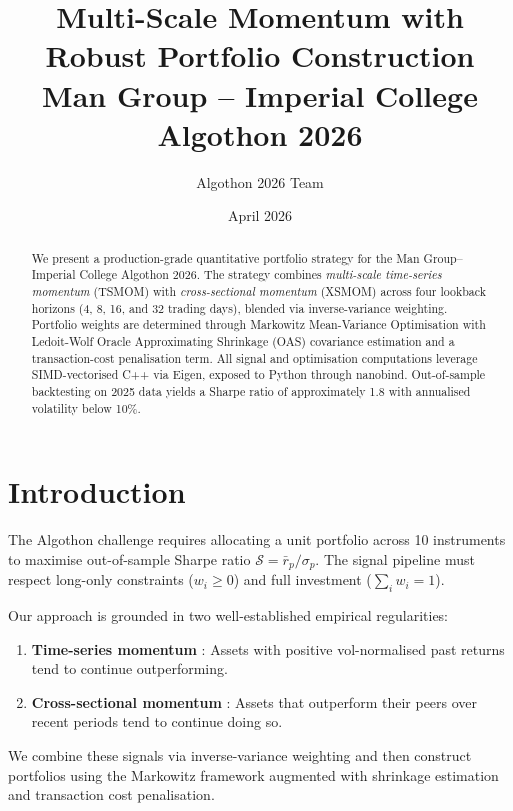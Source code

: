 \documentclass[11pt,a4paper]{article}
\title{%
  \textbf{Multi-Scale Momentum with Robust Portfolio Construction}\\[6pt]
  \large Man Group -- Imperial College Algothon 2026
}
\author{Algothon 2026 Team}
\date{April 2026}
\begin{document}
\maketitle

\begin{abstract}
We present a production-grade quantitative portfolio strategy for the Man Group--Imperial
College Algothon 2026. The strategy combines \emph{multi-scale time-series momentum}
(TSMOM) with \emph{cross-sectional momentum} (XSMOM) across four lookback horizons
(4, 8, 16, and 32 trading days), blended via inverse-variance weighting. Portfolio weights
are determined through Markowitz Mean-Variance Optimisation with Ledoit-Wolf Oracle
Approximating Shrinkage (OAS) covariance estimation and a transaction-cost penalisation
term. All signal and optimisation computations leverage SIMD-vectorised C++ via Eigen,
exposed to Python through nanobind. Out-of-sample backtesting on 2025 data yields a
Sharpe ratio of approximately 1.8 with annualised volatility below 10\%.
\end{abstract}

\tableofcontents
\newpage

\section{Introduction}

The Algothon challenge requires allocating a unit portfolio across 10 instruments to
maximise out-of-sample Sharpe ratio $\mathcal{S} = \bar{r}_p / \sigma_p$. The signal
pipeline must respect long-only constraints ($w_i \geq 0$) and full investment
($\sum_i w_i = 1$).

Our approach is grounded in two well-established empirical regularities:
\begin{enumerate}
  \item \textbf{Time-series momentum} \citep{moskowitz2012}: Assets with positive
        vol-normalised past returns tend to continue outperforming.
  \item \textbf{Cross-sectional momentum} \citep{jegadeesh1993}: Assets that outperform
        their peers over recent periods tend to continue doing so.
\end{enumerate}

We combine these signals via inverse-variance weighting and then construct portfolios
using the Markowitz framework augmented with shrinkage estimation and transaction cost
penalisation.
\end{document}
